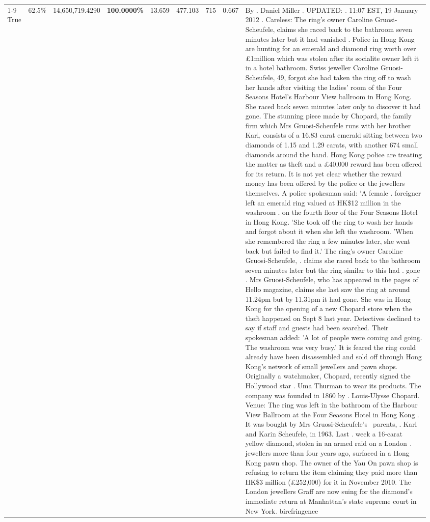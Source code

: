 \begin{table}[H]
\begin{tabular}{lllrlllll}
\cline{1-9}
True & 62.5\% & 14,650,719.4290 & \bfseries \color{red} 100.0000\% & 13.659 & 477.103 & 715 & 0.667 & By . Daniel Miller . UPDATED: . 11:07 EST, 19 January 2012 . Careless: The ring's owner Caroline Gruosi-Scheufele, claims she raced back to the bathroom seven minutes later but it had vanished . Police in Hong Kong are hunting for an emerald and diamond ring worth over £1million which was stolen after its socialite owner left it in a hotel bathroom. Swiss jeweller Caroline Gruosi-Scheufele, 49, forgot she had taken the ring off to wash her hands after visiting the ladies' room of the Four Seasons Hotel's Harbour View ballroom in Hong Kong. She raced back seven minutes later only to discover it had gone. The stunning piece made by Chopard, the family firm which Mrs Gruosi-Scheufele runs with her brother Karl, consists of a 16.83 carat emerald sitting between two diamonds of 1.15 and 1.29 carats, with another 674 small diamonds around the band. Hong Kong police are treating the matter as theft and a £40,000 reward has been offered for its return. It is not yet clear whether the reward money has been offered by the police or the jewellers themselves. A police spokesman said: 'A female . foreigner left an emerald ring valued at HK\$12 million in the washroom . on the fourth floor of the Four Seasons Hotel in Hong Kong. 'She took off the ring to wash her hands and forgot about it when she left the washroom. 'When she remembered the ring a few minutes later, she went back but failed to find it.' The ring's owner Caroline Gruosi-Scheufele, . claims she raced back to the bathroom seven minutes later but the ring similar to this had . gone . Mrs Gruosi-Scheufele, who has appeared in the pages of Hello magazine, claims she last saw the ring at around 11.24pm but by 11.31pm it had gone. She was in Hong Kong for the opening of a new Chopard store when the theft happened on Sept 8 last year. Detectives declined to say if staff and guests had been searched. Their spokesman added: 'A lot of people were coming and going. The washroom was very busy.' It is feared the ring could already have been disassembled and sold off through Hong Kong's network of small jewellers and pawn shops. Originally a watchmaker, Chopard, recently signed the Hollywood star . Uma Thurman to wear its products. The company was founded in 1860 by . Louis-Ulysse Chopard. Venue: The ring was left in the bathroom of the Harbour View Ballroom at the Four Seasons Hotel in Hong Kong . It was bought by Mrs Gruosi-Scheufele's  parents, . Karl and Karin Scheufele, in 1963. Last . week a 16-carat yellow diamond, stolen in an armed raid on a London . jewellers more than four years ago, surfaced in a Hong Kong pawn shop. The owner of the Yau On pawn shop is refusing to return the item claiming they paid more than HK\$3 million (£252,000) for it in November 2010. The London jewellers Graff are now suing for the diamond’s immediate return at Manhattan’s state supreme court in New York. birefringence \\

\end{tabular}
\end{table}
